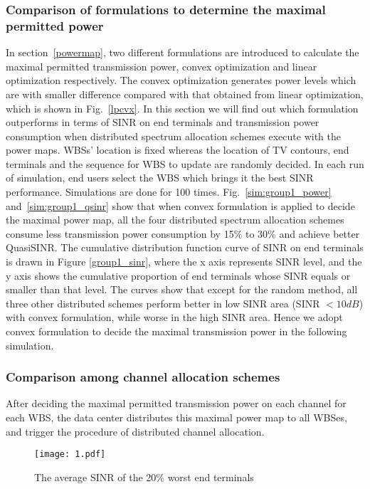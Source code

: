 \subsubsection{Comparison of formulations to determine the maximal permitted power}
In section~\ref{powermap}, two different formulations are introduced to calculate the maximal permitted transmission power, \ie convex optimization and linear optimization respectively.
The convex optimization generates power levels which are with smaller difference compared with that obtained from linear optimization, which is shown in Fig.~\ref{lpcvx}.
In this section we will find out which formulation outperforms in terms of SINR on end terminals and transmission power consumption when distributed spectrum allocation schemes execute with the power maps.
WBSs' location is fixed whereas the location of TV contours, end terminals and the sequence for WBS to update are randomly decided.
In each run of simulation, end users select the WBS which brings it the best SINR performance.
Simulations are done for 100 times.
Fig.~\ref{sim:group1_power} and~\ref{sim:group1_qsinr} show that when convex formulation is applied to decide the maximal power map, all the four distributed spectrum allocation schemes consume less transmission power consumption by 15\% to 30\% and achieve better QuasiSINR. 
The cumulative distribution function curve of SINR on end terminals is drawn in Figure \ref{group1_sinr}, where the x axis represents SINR level, and the y axis shows the cumulative proportion of end terminals whose SINR equals or smaller than that level. 
The curves show that except for the random method, all three other distributed schemes perform better in low SINR area (SINR $<10 dB$) with convex formulation, while worse in the high SINR area. 
Hence we adopt convex formulation to decide the maximal transmission power in the following simulation.


\subsubsection{Comparison among channel allocation schemes }
After deciding the maximal permitted transmission power on each channel for each WBS, the data center distributes this maximal power map to all WBSes, and trigger the procedure of distributed channel allocation. 
\begin{figure}[h!]
  \centering
  \texttt{[image: 1.pdf]}
  \caption{The average SINR of the 20\% worst end terminals}
\label{group1_worst20sinr}
\end{figure}


